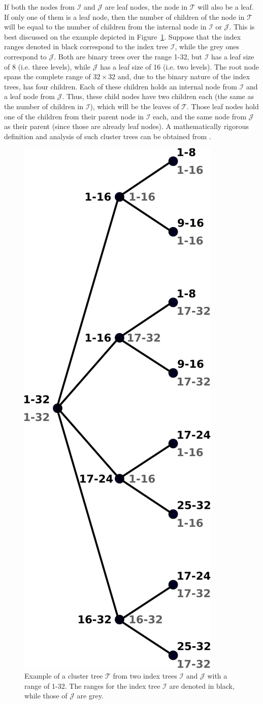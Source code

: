 If both the nodes from $\mathcal{I}$ and $\mathcal{J}$ are leaf nodes, the node in $\mathcal{T}$ will also be a leaf. If only one of them is a leaf node, then the number of children of the node in $\mathcal{T}$ will be equal to the number of children from the internal node in $\mathcal{I}$ or $\mathcal{J}$. This is best discussed on the example depicted in Figure~\hyperref[fig:cluster_tree]{\ref{fig:cluster_tree}}. Suppose that the index ranges denoted in black correspond to the index tree $\mathcal{I}$, while the grey ones correspond to $\mathcal{J}$. Both are binary trees over the range 1-32, but $\mathcal{I}$ has a leaf size of 8 (i.e. three levels), while $\mathcal{J}$ has a leaf size of 16 (i.e. two levels). The root node spans the complete range of $32 \times 32$ and, due to the binary nature of the index trees, has four children. Each of these children holds an internal node from $\mathcal{I}$ and a leaf node from $\mathcal{J}$. Thus, these child nodes have two children each (the same as the number of children in $\mathcal{I}$), which will be the leaves of $\mathcal{T}$. Those leaf nodes hold one of the children from their parent node in $\mathcal{I}$ each, and the same node from $\mathcal{J}$ as their parent (since those are already leaf nodes). A mathematically rigorous definition and analysis of such cluster trees can be obtained from \cite{hackbusch_hierarchical_2015}.

\begin{figure}[h]
    \centering
    \includegraphics[width=0.3\linewidth]{chapters/4_hierarchical_matrices/figures/cluster_tree.pdf}
    \caption[Cluster Tree]{Example of a cluster tree $\mathcal{T}$ from two index trees $\mathcal{I}$ and $\mathcal{J}$ with a range of 1-32. The ranges for the index tree $\mathcal{I}$ are denoted in black, while those of $\mathcal{J}$ are grey.}  \label{fig:cluster_tree}
\end{figure}